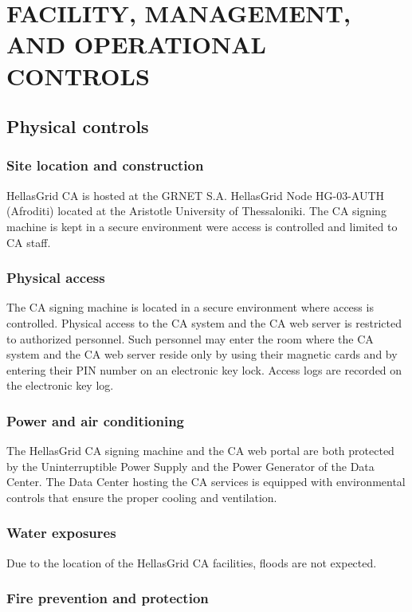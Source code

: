 
\chapter{FACILITY, MANAGEMENT, AND OPERATIONAL CONTROLS}
\section{Physical controls}
\subsection{Site location and construction}

HellasGrid CA is hosted at the GRNET S.A. HellasGrid Node HG-03-AUTH (Afroditi) located at the Aristotle University of Thessaloniki. The CA signing machine is kept in a secure environment were access is controlled and limited to CA staff. 


\subsection{Physical access}

The CA signing machine is located in a secure environment where access is controlled. Physical access to the CA system and the CA web server is restricted to authorized personnel. Such personnel may enter the room where the CA system and the CA web server reside only by using their magnetic cards and by entering their PIN number on an electronic key lock. Access logs are recorded on the electronic key log. 

\subsection{Power and air conditioning}

The HellasGrid CA signing machine and the CA web portal are both protected by the  Uninterruptible Power Supply and the Power Generator of the Data Center. The Data Center hosting the CA services is equipped with environmental controls that ensure the proper cooling and ventilation.

\subsection{Water exposures}

Due to the location of the HellasGrid CA facilities, floods are not expected.

\subsection{Fire prevention and protection}


